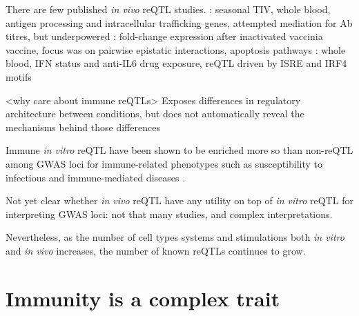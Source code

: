 \begin{outline}
    \2 There are few published \textit{in vivo} \gls{reQTL} studies.
        \3 \autocite{franco2013IntegrativeGenomicAnalysis}: seasonal \gls{TIV}, whole blood, antigen processing and intracellular trafficking genes, attempted mediation for Ab titres, but underpowered
        \3 \autocite{lareau2016InteractionQuantitativeTrait}: fold-change expression after inactivated vaccinia vaccine, focus was on pairwise epistatic interactions, apoptosis pathways
        \3 \autocite{davenport2018DiscoveringVivoCytokineeQTL}: whole blood, IFN status and anti-IL6 drug exposure, reQTL driven by ISRE and IRF4 motifs

\1 <why care about immune reQTLs>
    \2 Exposes differences in regulatory architecture between conditions, but does not automatically reveal the mechanisms behind those differences 

    \2 Immune \textit{in vitro} \gls{reQTL} have been shown to be enriched more so than non-\gls{reQTL} among GWAS loci for immune-related phenotypes such as
    susceptibility to infectious \autocite{barreiro2012DecipheringGeneticArchitecture,manry2017DecipheringGeneticControl}
    and immune-mediated diseases \autocite{manry2017DecipheringGeneticControl,kim-hellmuth2017GeneticRegulatoryEffects}.

    \2 Not yet clear whether \textit{in vivo} reQTL have any utility on top of \textit{in vitro} reQTL for interpreting GWAS loci: not that many studies, and complex interpretations.

    \2 Nevertheless, as the number of cell types systems and stimulations both \textit{in vitro} and \textit{in vivo} increases, the number of known reQTLs continues to grow.

\section{Immunity is a complex trait}


\end{outline}
